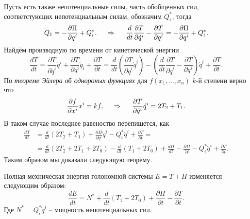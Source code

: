 Пусть есть также непотенциальные силы, часть обобщенных сил, соответстующих непотенциальным силам, обозначим $Q_i^*$, тогда
\begin{equation*}
    Q_1 = - \frac{\partial \Pi}{\partial q^i} + Q_i^*,
    \hspace{0.5cm} \Rightarrow \hspace{0.5cm} 
    \frac{d }{d t} \frac{\partial T}{\partial \dot{q}^i} - 
    \frac{\partial T}{\partial q^i} 
    =
    - \frac{\partial \Pi}{\partial q^i} + Q_i^*.
\end{equation*}
Найдём производную по времени от кинетической энергии
\begin{equation*}
    \frac{d T}{d t} = 
    \frac{\partial T}{\partial \dot{q}^i} \ddot{q}^i + \frac{\partial T}{\partial q^i} \dot{q}_i + \frac{\partial T}{\partial t}  =
    \frac{d }{d t} \left(
        \frac{\partial T}{\partial \dot{q}^i} \dot{q}^i
    \right) - \left(
        \frac{d }{d t} \frac{\partial T}{\partial \dot{q}^i} - \frac{\partial T}{\partial q^i} 
    \right) \dot{q}^i + \frac{\partial T}{\partial t}.
\end{equation*}
По \textit{теореме Эйлера об однороных функциях} для $f(x_1, \ldots, x_n)$ $k$-й степени верно что
\begin{equation*}
    \frac{\partial f}{\partial x^i} x^i = kf,
    \hspace{0.5cm} \Rightarrow \hspace{0.5cm} 
    \frac{\partial T}{\partial \dot{q}^i} \dot{q}^i = 2 T_2 + T_1.
\end{equation*}
В таком случае последнее равеноство перепишется, как
\begin{align*}
    \frac{d T}{d t} 
    &=
    \frac{d }{d t} (2 T_2 + T_1) + \frac{\partial \Pi}{\partial q^i} \dot{q}^i - Q_i^* \dot{q}^i + \frac{\partial T}{\partial t} 
    = \\ &= 
    \frac{d }{d t} (2 T_2 + 2 T_1 + 2 T_0) - \frac{d }{d t} (T_1 + 2 T_0) + \frac{d \Pi}{d t} - \frac{\partial \Pi}{\partial t} - Q_i^* \dot{q}^i + \frac{\partial T}{\partial t}.
\end{align*}
Таким образом мы доказали следующую теорему.

\begin{to_thr}
     Полная мехническая энергия голономной системы $E = T+ \Pi$ изменяется следующим образом:
     \begin{equation*}
         \frac{d E}{d t} = N^* + \frac{d }{d t} (T_1 + 2 T_0) + \frac{\partial \Pi}{\partial t} - \frac{\partial T}{\partial t}.
     \end{equation*}
     Где $N^* = Q_i^* \dot{q}^i$ -- мощность непотенциальных сил.
\end{to_thr}


